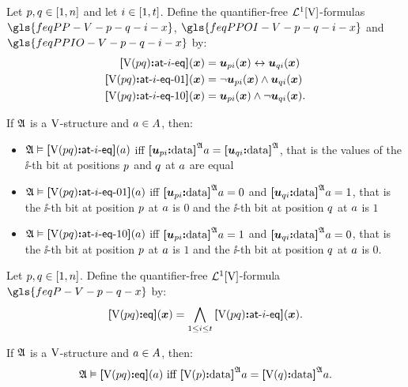 \begin{definition}
Let $p, q \in [1, n]$ and let $i \in [1, t]$. Define the
quantifier-free $\mathcal{L}^{1}[{\mathrm{V}}]$-formulas $\gls{feqPP-V-p-q-i-x}$,
$\gls{feqPPOI-V-p-q-i-x}$ and $\gls{feqPPIO-V-p-q-i-x}$ by:
\begin{align*}
  {\bm{[}{\mathrm{V}}(pq)\mathord{\bm{:}} \mathsf{at}{\hbox{-}}i{\hbox{-}}\mathsf{eq} \bm{]}}(\bm{x}) &= \bm{u}_{pi}(\bm{x}) \leftrightarrow \bm{u}_{qi}(\bm{x}) \\
  {\bm{[}{\mathrm{V}}(pq)\mathord{\bm{:}} \mathsf{at}{\hbox{-}}i{\hbox{-}}\mathsf{eq}{\hbox{-}}01 \bm{]}}(\bm{x}) &= \lnot\bm{u}_{pi}(\bm{x}) \land \bm{u}_{qi}(\bm{x}) \\
  {\bm{[}{\mathrm{V}}(pq)\mathord{\bm{:}} \mathsf{at}{\hbox{-}}i{\hbox{-}}\mathsf{eq}{\hbox{-}}10 \bm{]}}(\bm{x}) &= \bm{u}_{pi}(\bm{x}) \land
  \lnot\bm{u}_{qi}(\bm{x}).
\end{align*}
\end{definition}
\begin{remark}
If $\mathfrak{A}$ is a ${\mathrm{V}}$-structure and $a \in A$, then:
\begin{itemize}
  \item $\mathfrak{A} \vDash {\bm{[}{\mathrm{V}}(pq)\mathord{\bm{:}} \mathsf{at}{\hbox{-}}i{\hbox{-}}\mathsf{eq} \bm{]}}(a)$ iff
  ${\bm{[}\bm{u}_{pi}\mathord{\bm{:}}\mathrm{data}\bm{]}}^{\mathfrak{A}}a = {\bm{[}\bm{u}_{qi}\mathord{\bm{:}}\mathrm{data}\bm{]}}^{\mathfrak{A}}$, that is
  the values of the $\ii$-th bit at positions $p$ and $q$ at $a$ are
  equal
  
  \item $\mathfrak{A} \vDash {\bm{[}{\mathrm{V}}(pq)\mathord{\bm{:}} \mathsf{at}{\hbox{-}}i{\hbox{-}}\mathsf{eq}{\hbox{-}}01 \bm{]}}(a)$ iff
  ${\bm{[}\bm{u}_{pi}\mathord{\bm{:}}\mathrm{data}\bm{]}}^{\mathfrak{A}}a = 0$ and ${\bm{[}\bm{u}_{qi}\mathord{\bm{:}}\mathrm{data}\bm{]}}^{\mathfrak{A}}a = 1$,
  that is the $\ii$-th bit at position $p$ at $a$ is $0$ and the $\ii$-th
  bit at position $q$ at $a$ is $1$
  
  \item $\mathfrak{A} \vDash {\bm{[}{\mathrm{V}}(pq)\mathord{\bm{:}} \mathsf{at}{\hbox{-}}i{\hbox{-}}\mathsf{eq}{\hbox{-}}10 \bm{]}}(a)$ iff
  ${\bm{[}\bm{u}_{pi}\mathord{\bm{:}}\mathrm{data}\bm{]}}^{\mathfrak{A}}a = 1$ and ${\bm{[}\bm{u}_{qi}\mathord{\bm{:}}\mathrm{data}\bm{]}}^{\mathfrak{A}}a = 0$,
  that is the $\ii$-th bit at position $p$ at $a$ is $1$ and the $\ii$-th
  bit at position $q$ at $a$ is $0$.
\end{itemize}
\end{remark}
\begin{definition}
Let $p, q \in [1, n]$. Define the quantifier-free
$\mathcal{L}^{1}[{\mathrm{V}}]$-formula $\gls{feqP-V-p-q-x}$ by:
\[
  {\bm{[}{\mathrm{V}}(pq)\mathord{\bm{:}} \mathsf{eq}\bm{]}}(\bm{x}) = \bigwedge_{1 \leq i \leq t}
  {\bm{[}{\mathrm{V}}(pq)\mathord{\bm{:}} \mathsf{at}{\hbox{-}}i{\hbox{-}}\mathsf{eq} \bm{]}}(\bm{x}).
\]
\end{definition}
\begin{remark}
If $\mathfrak{A}$ is a ${\mathrm{V}}$-structure and $a \in A$,
then: 
\[
  \miff{
  \StrA \vDash \feqP\VS\posp\posq(\ea)}{
  \data{\VSp\posp}\StrA\ea = \data{\VSp\posq}\StrA\ea}.
\]
\end{remark}

